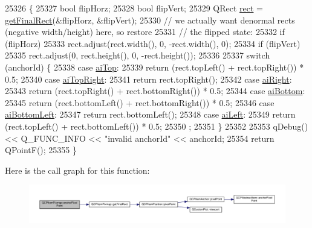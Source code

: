 \begin{DoxyCode}
25326                                                           \{
25327   \textcolor{keywordtype}{bool} flipHorz;
25328   \textcolor{keywordtype}{bool} flipVert;
25329   QRect \hyperlink{_gen_blob_8m_aea8f6815d9a63491fc422c5572c6b3c3}{rect} = \hyperlink{class_q_c_p_item_pixmap_a245ef0c626cab7096a810442f2f6a2d9}{getFinalRect}(&flipHorz, &flipVert);
25330   \textcolor{comment}{// we actually want denormal rects (negative width/height) here, so restore}
25331   \textcolor{comment}{// the flipped state:}
25332   \textcolor{keywordflow}{if} (flipHorz)
25333     rect.adjust(rect.width(), 0, -rect.width(), 0);
25334   \textcolor{keywordflow}{if} (flipVert)
25335     rect.adjust(0, rect.height(), 0, -rect.height());
25336 
25337   \textcolor{keywordflow}{switch} (anchorId) \{
25338   \textcolor{keywordflow}{case} \hyperlink{class_q_c_p_item_pixmap_a0ea7f65edb7395e02de521915f221174a90e523ebaed7921ca90cf1b08944ece5}{aiTop}:
25339     \textcolor{keywordflow}{return} (rect.topLeft() + rect.topRight()) * 0.5;
25340   \textcolor{keywordflow}{case} \hyperlink{class_q_c_p_item_pixmap_a0ea7f65edb7395e02de521915f221174a33c256cdec46fa1587534fcd6e776799}{aiTopRight}:
25341     \textcolor{keywordflow}{return} rect.topRight();
25342   \textcolor{keywordflow}{case} \hyperlink{class_q_c_p_item_pixmap_a0ea7f65edb7395e02de521915f221174ab22d91dae59c0d4a65416a0d677b2d05}{aiRight}:
25343     \textcolor{keywordflow}{return} (rect.topRight() + rect.bottomRight()) * 0.5;
25344   \textcolor{keywordflow}{case} \hyperlink{class_q_c_p_item_pixmap_a0ea7f65edb7395e02de521915f221174a04b5e041b4dd0def2b60c5cfea2bc1a4}{aiBottom}:
25345     \textcolor{keywordflow}{return} (rect.bottomLeft() + rect.bottomRight()) * 0.5;
25346   \textcolor{keywordflow}{case} \hyperlink{class_q_c_p_item_pixmap_a0ea7f65edb7395e02de521915f221174ae14886b381136898e37e89af5046a1cc}{aiBottomLeft}:
25347     \textcolor{keywordflow}{return} rect.bottomLeft();
25348   \textcolor{keywordflow}{case} \hyperlink{class_q_c_p_item_pixmap_a0ea7f65edb7395e02de521915f221174a9efe71239b9409ebe1c2813a37807f2a}{aiLeft}:
25349     \textcolor{keywordflow}{return} (rect.topLeft() + rect.bottomLeft()) * 0.5;
25350     ;
25351   \}
25352 
25353   qDebug() << Q\_FUNC\_INFO << \textcolor{stringliteral}{"invalid anchorId"} << anchorId;
25354   \textcolor{keywordflow}{return} QPointF();
25355 \}
\end{DoxyCode}


Here is the call graph for this function\+:\nopagebreak
\begin{figure}[H]
\begin{center}
\leavevmode
\includegraphics[width=350pt]{class_q_c_p_item_pixmap_a88abce3c1027f371cddcf6dad35ffbb1_cgraph}
\end{center}
\end{figure}


